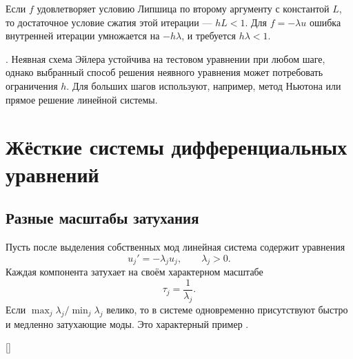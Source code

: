 \documentclass[../final.tex]{subfiles}
\begin{document}
Если $f$ удовлетворяет условию Липшица по второму аргументу
с константой $L$, то достаточное условие сжатия этой итерации --- $hL<1$.
Для $f=-\lambda u$ ошибка внутренней итерации умножается на $-h\lambda$,
и требуется $h\lambda<1$.

\remark
{}. Неявная схема Эйлера устойчива на тестовом уравнении при любом
шаге, однако выбранный способ решения неявного уравнения может
потребовать ограничения $h$. Для больших шагов используют, например,
метод Ньютона или прямое решение линейной системы.

\section{Жёсткие системы дифференциальных уравнений}

\subsection{Разные масштабы затухания}

Пусть после выделения собственных мод линейная система содержит
уравнения
\begin{equation*}
    u_j'=-\lambda_j u_j,\qquad \lambda_j>0.
\end{equation*}
Каждая компонента затухает на своём характерном масштабе
\begin{equation*}
    \tau_j=\frac1{\lambda_j}.
\end{equation*}
Если $\max_j\lambda_j/\min_j\lambda_j$ велико, то в системе
одновременно присутствуют быстро и медленно затухающие моды.
Это характерный пример .

\begin{rbox}[breakable=false,left=18pt,right=18pt,top=14pt,bottom=10pt]{[]}
    \centering
    \label{fig:ovf7_stiff_modes}
\end{rbox}
\end{document}
